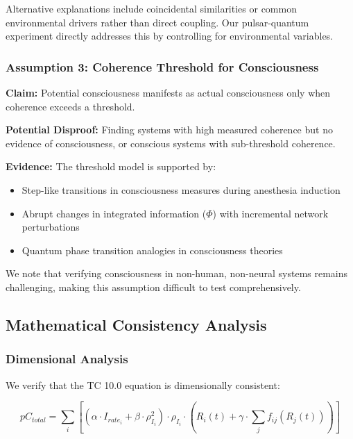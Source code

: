 \documentclass[12pt]{article}
\begin{document}
Alternative explanations include coincidental similarities or common environmental drivers rather than direct coupling. Our pulsar-quantum experiment directly addresses this by controlling for environmental variables.

\subsubsection{Assumption 3: Coherence Threshold for Consciousness}

\textbf{Claim:} Potential consciousness manifests as actual consciousness only when coherence exceeds a threshold.

\textbf{Potential Disproof:} Finding systems with high measured coherence but no evidence of consciousness, or conscious systems with sub-threshold coherence.

\textbf{Evidence:} The threshold model is supported by:

\begin{itemize}
    \item Step-like transitions in consciousness measures during anesthesia induction \cite{chennu2014}
    \item Abrupt changes in integrated information ($\Phi$) with incremental network perturbations \cite{tononi2016}
    \item Quantum phase transition analogies in consciousness theories \cite{hameroff2014}
\end{itemize}

We note that verifying consciousness in non-human, non-neural systems remains challenging, making this assumption difficult to test comprehensively.

\subsection{Mathematical Consistency Analysis}

\subsubsection{Dimensional Analysis}

We verify that the TC 10.0 equation is dimensionally consistent:

\begin{equation}
pC_{total} = \sum_{i} [(\alpha \cdot I_{rate_i} + \beta \cdot \rho_{I_i}^2) \cdot \rho_{I_i} \cdot (R_i(t) + \gamma \cdot \sum_{j} f_{ij}(R_j(t)))]
\end{equation}
\end{document}
